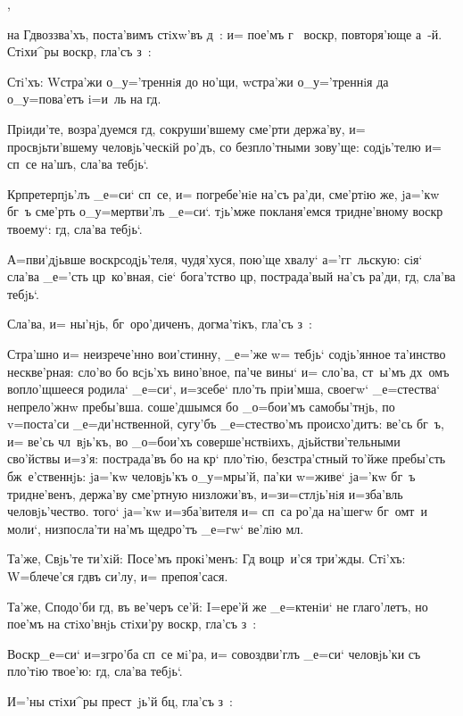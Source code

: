 ,

на Гд воззва'хъ, поста'вимъ стiхw'въ д~: и= пое'мъ 
г~ воскр, повторя'юще а~-й. Стiхи^ры воскр, 
гла'съ з~:

Стi'хъ: W\т стра'жи о_у='треннiя до но'щи, w\т стра'жи 
о_у='треннiя да о_у=пова'етъ i=и~ль на гд.

Прiиди'те, возра'дуемся гд, сокруши'вшему сме'рти 
держа'ву, и= просвjьти'вшему человjь'ческiй ро'дъ, со 
безпло'тными зову'ще: содjь'телю и= сп~се на'шъ, сла'ва 
тебjь`.

Кр претерпjь'лъ _е=си` сп~се, и= погребе'нiе на'съ 
ра'ди, сме'ртiю же, jа='кw бг~ъ сме'рть о_у=мертви'лъ 
_е=си`. тjь'мже покланя'емся тридне'вному воскр 
твоему`: гд, сла'ва тебjь`.

А=п ви'дjьвше воскр содjь'теля, чудя'хуся, 
пою'ще хвалу` а='гг~льскую: сiя` сла'ва _е='сть 
цр~ко'вная, сiе` бога'тство цр, пострада'вый на'съ 
ра'ди, гд, сла'ва тебjь`.

Сла'ва, и= ны'нjь, бг~оро'диченъ, догма'тiкъ, гла'съ 
з~:

Стра'шно и= неизрече'нно вои'стинну, _е='же w= тебjь` 
содjь'янное та'инство нескве'рная: сло'во бо всjь'хъ 
вино'вное, па'че вины` и= сло'ва, ст~ы'мъ дх~омъ 
вопло'щшееся родила` _е=си`, и=з\ъ себе` пло'ть прiи'мша, 
своегw` _е=стества` непрело'жнw пребы'вша. соше'дшымся бо 
_о=бои'мъ самобы'тнjь, по v=поста'си _е=ди'нственной, 
сугу'бъ _е=стество'мъ происхо'дитъ: ве'сь бг~ъ, и= ве'сь 
чл~вjь'къ, во _о=бои'хъ соверше'нствiихъ, 
дjьйстви'тельными сво'йствы и=з'я: пострада'въ бо 
на кр` пло'тiю, безстра'стный то'йже пребы'сть 
бж~е'ственнjь: jа='кw человjь'къ о_у=мры'й, па'ки w=живе` 
jа='кw бг~ъ тридне'венъ, держа'ву сме'ртную низложи'въ, 
и=з\ъ и=стлjь'нiя и=зба'вль человjь'чество. того` jа='кw 
и=зба'вителя и= сп~са ро'да на'шегw бг~омт~и моли`, 
низпосла'ти на'мъ щедро'тъ _е=гw` ве'лiю мл.

Та'же, Свjь'те ти'хiй: Посе'мъ прокi'менъ: Гд 
воцр~и'ся три'жды. Стi'хъ: W=блече'ся гд въ си'лу, и= 
препоя'сася.

Та'же, Сподо'би гд, въ ве'черъ се'й: I=ере'й же 
_е=ктенiи` не глаго'летъ, но пое'мъ на стiхо'внjь 
стiхи'ру воскр, гла'съ з~:

Воскр _е=си` и=з\ъ гро'ба сп~се мi'ра, и= 
совоздви'глъ _е=си` человjь'ки съ пло'тiю твое'ю: гд, 
сла'ва тебjь`.

И='ны стiхи^ры прест~jь'й бц, гла'съ з~:

